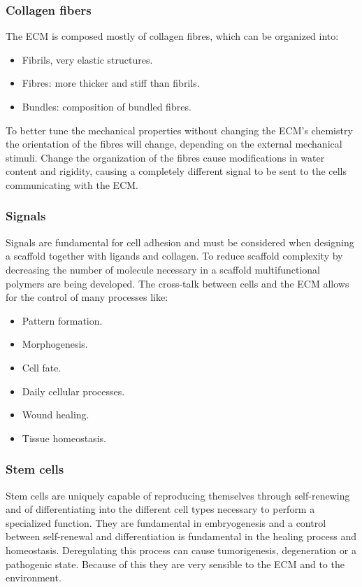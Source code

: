 		\subsubsection{Collagen fibers}
		The ECM is composed mostly of collagen fibres, which can be organized into:

		\begin{multicols}{2}
			\begin{itemize}
				\item Fibrils, very elastic structures.
				\item Fibres: more thicker and stiff than fibrils.
				\item Bundles: composition of bundled fibres.
			\end{itemize}
		\end{multicols}

		To better tune the mechanical properties without changing the ECM's chemistry the orientation of the fibres will change, depending on the external mechanical stimuli.
		Change the organization of the fibres cause modifications in water content and rigidity, causing a completely different signal to be sent to the cells communicating with the ECM.

		\subsubsection{Signals}
		Signals are fundamental for cell adhesion and must be considered when designing a scaffold together with ligands and collagen.
		To reduce scaffold complexity by decreasing the number of molecule necessary in a scaffold multifunctional polymers are being developed.
		The cross-talk between cells and the ECM allows for the control of many processes like:

		\begin{multicols}{3}
			\begin{itemize}
				\item Pattern formation.
				\item Morphogenesis.
				\item Cell fate.
				\item Daily cellular processes.
				\item Wound healing.
				\item Tissue homeostasis.
			\end{itemize}
		\end{multicols}

		\subsubsection{Stem cells}
		Stem cells are uniquely capable of reproducing themselves through self-renewing and of differentiating into the different cell types necessary to perform a specialized function.
		They are fundamental in embryogenesis and a control between self-renewal and differentiation is fundamental in the healing process and homeostasis.
		Deregulating this process can cause tumorigenesis, degeneration or a pathogenic state.
		Because of this they are very sensible to the ECM and to the environment.

